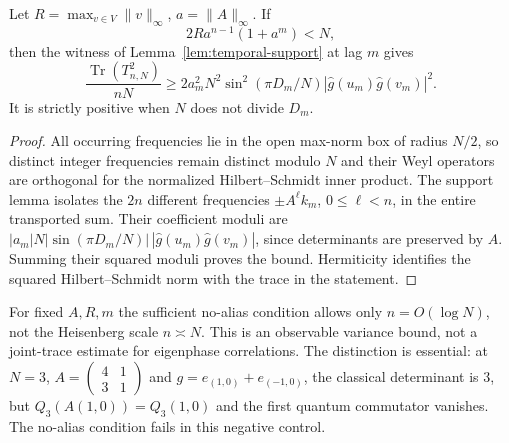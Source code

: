 \begin{proposition}\label{prop:temporal-quantum}
Let $R=\max_{v\in V}\|v\|_\infty$, $a=\|A\|_\infty$. If
\[
                 2R a^{n-1}(1+a^m)<N,
\]
then the witness of Lemma~\ref{lem:temporal-support} at lag $m$ gives
\[
 \frac{\operatorname{Tr}(T_{n,N}^2)}{nN}
 \ge2a_m^2N^2\sin^2(\pi D_m/N)
                   |\widehat g(u_m)\widehat g(v_m)|^2.
\]
It is strictly positive when $N$ does not divide $D_m$.
\end{proposition}
\begin{proof}
All occurring frequencies lie in the open max-norm box of radius $N/2$,
so distinct integer frequencies remain distinct modulo $N$ and their Weyl
operators are orthogonal for the normalized Hilbert--Schmidt inner product.
The support lemma isolates the $2n$ different frequencies
$\pm A^\ell k_m$, $0\le\ell<n$, in the entire transported sum.
Their coefficient moduli are
$|a_m|N|\sin(\pi D_m/N)|\,|\widehat g(u_m)\widehat g(v_m)|$,
since determinants are preserved by $A$. Summing their squared moduli proves
the bound. Hermiticity identifies the squared Hilbert--Schmidt norm with the
trace in the statement.
\end{proof}
For fixed $A,R,m$ the sufficient no-alias condition allows only
$n=O(\log N)$, not the Heisenberg scale $n\asymp N$. This is an observable
variance bound, not a joint-trace estimate for eigenphase correlations.
The distinction is essential: at $N=3$, $A=\left(\begin{smallmatrix}4&1\\3&1\end{smallmatrix}\right)$
and $g=e_{(1,0)}+e_{(-1,0)}$, the classical determinant is $3$, but
$Q_3(A(1,0))=Q_3(1,0)$ and the first quantum commutator vanishes.
The no-alias condition fails in this negative control.
